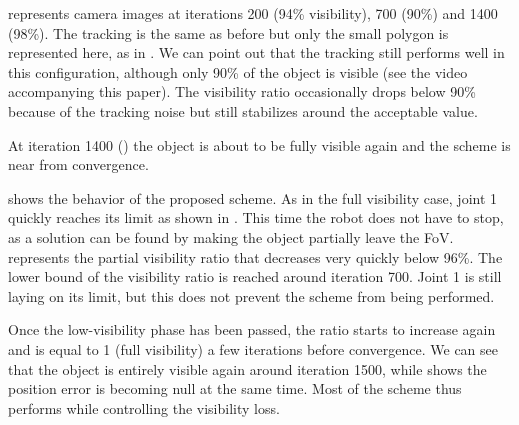 \documentclass[letterpaper, 10 pt, conference]{IEEEtran}  %
\begin{document}
 represents camera images at iterations 200 (94\% visibility), 700 (90\%) and 1400 (98\%). The tracking is the same as before but only the small polygon is represented here, as in . We can point out that the tracking still performs well in this configuration, although only 90\% of the object is visible (see the video accompanying this paper). The visibility ratio occasionally drops below 90\% because of the tracking noise but still stabilizes around the acceptable value.


At iteration 1400 () the object is about to be fully visible again and the scheme is near from convergence.

 shows the behavior of the proposed scheme. As in the full visibility case, joint 1 quickly reaches its limit as shown in .
This time the robot does not have to stop, as a solution can be found by making the object partially leave the FoV. 
 represents the partial visibility ratio that decreases very quickly below 96\%. 
The lower bound of the visibility ratio is reached around iteration 700. Joint 1 is still laying on its limit, but this does not prevent the scheme from being performed.

Once the low-visibility phase has been passed, the ratio starts to increase again and is equal to 1 (full visibility) a few iterations before convergence. 
We can see that the object is entirely visible again around iteration 1500, while  shows the position error is becoming null at the same time. Most of the scheme thus performs while controlling the visibility loss.


\end{document}
